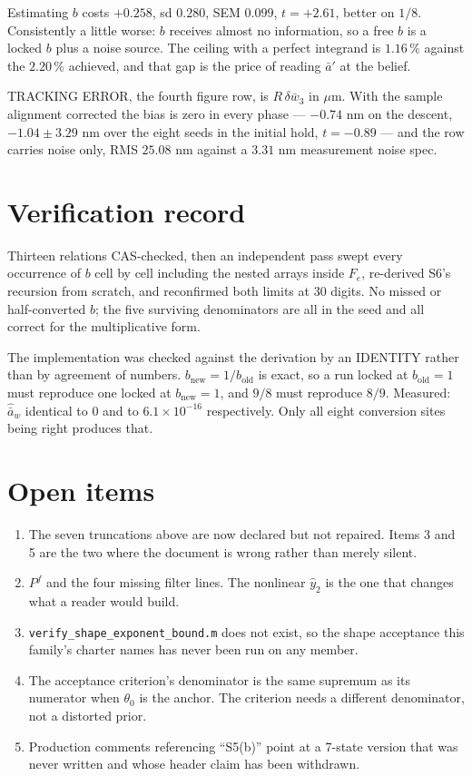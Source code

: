 \documentclass[11pt,a4paper,fontset=none]{ctexart}
\newcommand{\ba}{\bar{a}}
\newcommand{\bw}{\bar{w}}
\begin{document}
Estimating $b$ costs $+0.258$, sd $0.280$, SEM $0.099$, $t = +2.61$, better on
$1/8$. Consistently a little worse: $b$ receives almost no information, so a
free $b$ is a locked $b$ plus a noise source. The ceiling with a perfect
integrand is $1.16\,\%$ against the $2.20\,\%$ achieved, and that gap is the
price of reading $\ba'$ at the belief.

TRACKING ERROR, the fourth figure row, is $R\,\delta\bw_3$ in $\mu$m. With the
sample alignment corrected the bias is zero in every phase --- $-0.74$ nm on the
descent, $-1.04 \pm 3.29$ nm over the eight seeds in the initial hold, $t=-0.89$
--- and the row carries noise only, RMS $25.08$ nm against a $3.31$ nm
measurement noise spec.

\section*{Verification record}

Thirteen relations CAS-checked, then an independent pass swept every occurrence
of $b$ cell by cell including the nested arrays inside $F_e$, re-derived S6's
recursion from scratch, and reconfirmed both limits at 30 digits. No missed or
half-converted $b$; the five surviving denominators are all in the seed and all
correct for the multiplicative form.

The implementation was checked against the derivation by an IDENTITY rather than
by agreement of numbers. $b_{\mathrm{new}} = 1/b_{\mathrm{old}}$ is exact, so a
run locked at $b_{\mathrm{old}} = 1$ must reproduce one locked at
$b_{\mathrm{new}} = 1$, and $9/8$ must reproduce $8/9$. Measured: $\hat{\ba}_w$
identical to $0$ and to $6.1\times10^{-16}$ respectively. Only all eight
conversion sites being right produces that.

\section*{Open items}

\begin{enumerate}
\item The seven truncations above are now declared but not repaired. Items 3 and
5 are the two where the document is wrong rather than merely silent.
\item $P^{f}$ and the four missing filter lines. The nonlinear
$\hat{y}_2$ is the one that changes what a reader would build.
\item \texttt{verify\_shape\_exponent\_bound.m} does not exist, so the shape
acceptance this family's charter names has never been run on any member.
\item The acceptance criterion's denominator is the same supremum as its
numerator when $\theta_0$ is the anchor. The criterion needs a different
denominator, not a distorted prior.
\item Production comments referencing ``S5(b)'' point at a 7-state version that
was never written and whose header claim has been withdrawn.
\end{enumerate}
\end{document}
